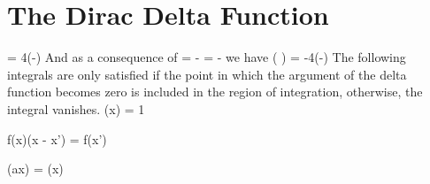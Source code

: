 \documentclass[oneside, 12pt]{book}
\begin{document}
\chapter{The Dirac Delta Function} \edef\TheDiracDeltaFunctionChapter{\thechapter}

\beq[eq:divdelta]  = 4\pi \delta(-)\eeq
And as a consequence of 
\beq[eq:grad1r]  = - = -\eeq
we have
\beq[eq:lapdelta] \laplacian\left( \right) = -4\pi \delta(-) \eeq
The following integrals are only satisfied if the point in which the argument of the delta function becomes zero is included in the region of integration, otherwise, the integral vanishes.
\beq[eq:intedelta] \int {} \delta(x) = 1\eeq

\beq[eq:deltapick] \int {}f(x)\delta(x - x') = f(x')\eeq

\beq[] \delta(ax) = \delta(x) \eeq
\end{document}
